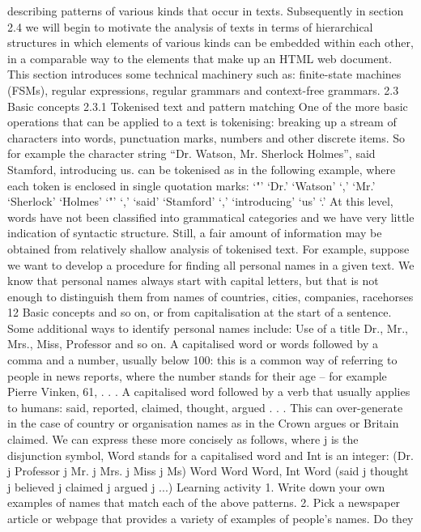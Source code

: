 describing patterns of various kinds that occur in texts. Subsequently in section 2.4
we will begin to motivate the analysis of texts in terms of hierarchical structures in
which elements of various kinds can be embedded within each other, in a
comparable way to the elements that make up an HTML web document. This section
introduces some technical machinery such as: finite-state machines (FSMs), regular
expressions, regular grammars and context-free grammars.
2.3 Basic concepts
2.3.1 Tokenised text and pattern matching
One of the more basic operations that can be applied to a text is tokenising:
breaking up a stream of characters into words, punctuation marks, numbers and
other discrete items. So for example the character string
“Dr. Watson, Mr. Sherlock Holmes”, said Stamford, introducing us.
can be tokenised as in the following example, where each token is enclosed in single
quotation marks:
`"' `Dr.' `Watson' `,' `Mr.' `Sherlock' `Holmes' `"' `,'
`said' `Stamford' `,' `introducing' `us' `.'
At this level, words have not been classified into grammatical categories and we
have very little indication of syntactic structure. Still, a fair amount of information
may be obtained from relatively shallow analysis of tokenised text. For example,
suppose we want to develop a procedure for finding all personal names in a given
text. We know that personal names always start with capital letters, but that is not
enough to distinguish them from names of countries, cities, companies, racehorses
12
Basic concepts
and so on, or from capitalisation at the start of a sentence. Some additional ways to
identify personal names include:
Use of a title Dr., Mr., Mrs., Miss, Professor and so on.
A capitalised word or words followed by a comma and a number, usually below
100: this is a common way of referring to people in news reports, where the
number stands for their age – for example Pierre Vinken, 61, . . .
A capitalised word followed by a verb that usually applies to humans: said,
reported, claimed, thought, argued . . . This can over-generate in the case of
country or organisation names as in the Crown argues or Britain claimed.
We can express these more concisely as follows, where j is the disjunction symbol,
Word stands for a capitalised word and Int is an integer:
(Dr. j Professor j Mr. j Mrs. j Miss j Ms) Word
Word Word, Int
Word (said j thought j believed j claimed j argued j ...)
Learning activity
1. Write down your own examples of names that match each of the above patterns.
2. Pick a newspaper article or webpage that provides a variety of examples of people’s names. Do they
